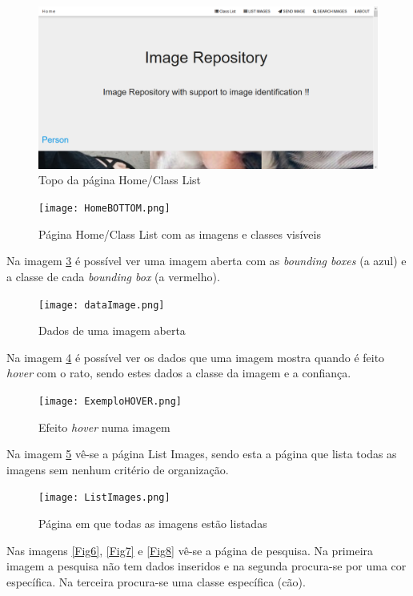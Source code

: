 \documentclass{report}
\begin{document}
\begin{figure}[H]
\includegraphics[width=\textwidth]{HomeTOP.png}
\caption{Topo da página Home/Class List}
\label{Fig1}
\end{figure}

\begin{figure}[H]
\texttt{[image: HomeBOTTOM.png]}
\caption{Página Home/Class List com as imagens e classes visíveis}
\label{Fig2}
\end{figure}

Na imagem \ref{Fig3} é possível ver uma imagem aberta com as \textit{bounding boxes} (a azul) e a classe de cada \textit{bounding box} (a vermelho).

\begin{figure}[H]
\texttt{[image: dataImage.png]}
\caption{Dados de uma imagem aberta}
\label{Fig3}
\end{figure}

Na imagem \ref{Fig4} é possível ver os dados que uma imagem mostra quando é feito \textit{hover} com o rato, sendo estes dados a classe da imagem e a confiança.

\begin{figure}[H]
\texttt{[image: ExemploHOVER.png]}
\caption{Efeito \textit{hover} numa imagem}
\label{Fig4}
\end{figure}

 Na imagem \ref{Fig5} vê-se a página List Images, sendo esta a página que lista todas as imagens sem nenhum critério de organização.

\begin{figure}[H]
\texttt{[image: ListImages.png]}
\caption{Página em que todas as imagens estão listadas}
\label{Fig5}
\end{figure}

Nas imagens \ref{Fig6}, \ref{Fig7} e \ref{Fig8} vê-se a página de pesquisa. Na primeira imagem a pesquisa não tem dados inseridos e na segunda procura-se por uma cor específica. Na terceira procura-se uma classe específica (cão).
\end{document}
